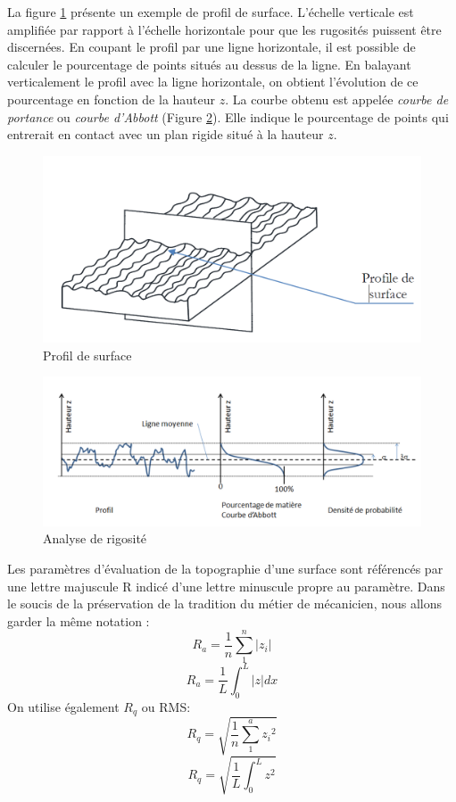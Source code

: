 La figure \ref{fig:profil-surface} présente un exemple de profil de surface. L’échelle verticale est amplifiée par rapport à l’échelle horizontale pour que les rugosités puissent être discernées. En coupant le profil par une ligne horizontale, il est possible de calculer le pourcentage de points situés au dessus de la ligne. En balayant verticalement le profil avec la ligne horizontale, on obtient l’évolution de ce pourcentage en fonction de la hauteur $z$. La courbe obtenu est appelée \emph{courbe de portance} ou \emph{courbe d'Abbott} (Figure \ref{fig:analysedistribution}). Elle indique le pourcentage de points qui entrerait en contact avec un plan rigide situé à la hauteur $z$.\cite{initiation}
\begin{figure}[h]
	\centering
	\includegraphics[width=0.7\linewidth]{"Img/profil surface"}
	\caption[profil surface]{Profil de surface}
	\label{fig:profil-surface}
\end{figure}
\begin{figure}[h]
	\centering
	\includegraphics[width=0.7\linewidth]{Img/analysedistribution}
	\caption[analyseRigosité]{Analyse de rigosité}
	\label{fig:analysedistribution}
\end{figure}

Les paramètres d’évaluation de la topographie d’une surface sont référencés par une lettre majuscule R indicé d’une lettre minuscule propre au paramètre. Dans le soucis de la préservation de la tradition du métier de mécanicien, nous allons garder la même notation :
\begin{equation}
	{R}_{a}=\frac{1}{n}\sum _{1}^{n}\left|z_i\right|
	\label{Ra}
\end{equation}
\begin{equation}
	{R}_{a}=\frac{1}{L}{\int }_{0}^{L}\left|z\right|dx
\end{equation}
On utilise également $R_q$ ou RMS:
\begin{equation}
		{R}_{q}=\sqrt{\frac{1}{n}\sum _{1}^{a}{z_i}^{2}}
\end{equation}
\begin{equation}
		{R}_{q}=\sqrt{\frac{1}{L}{\int }_{0}^{L}{z}^{2}}
\end{equation}

